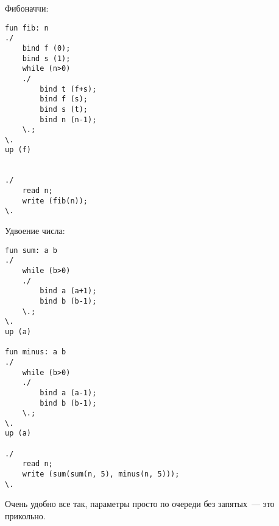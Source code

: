 \documentclass[10pt]{article}
\begin{document}
Фибоначчи:

\begin{verbatim}
fun fib: n
./
    bind f (0);
    bind s (1);
    while (n>0)
    ./
        bind t (f+s);
        bind f (s);
        bind s (t);
        bind n (n-1);
    \.;
\.
up (f)


./
    read n;
    write (fib(n));
\.
\end{verbatim}

Удвоение числа:

\begin{verbatim}
fun sum: a b
./
    while (b>0)
    ./
        bind a (a+1);
        bind b (b-1);
    \.;
\.
up (a)

fun minus: a b
./
    while (b>0)
    ./
        bind a (a-1);
        bind b (b-1);
    \.;
\.
up (a)

./
    read n;
    write (sum(sum(n, 5), minus(n, 5)));
\.
\end{verbatim}



Очень удобно все так, параметры просто по очереди без запятых~--- это прикольно.

\label{LastPage}
\end{document}
